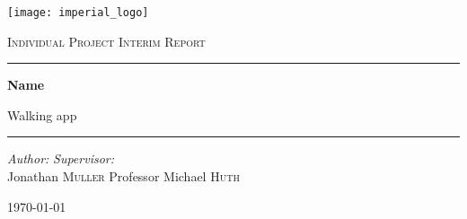 \begin{titlepage}
    \begin{center}
        \vspace*{2cm}
        \texttt{[image: imperial\_logo]}
        \vspace{2cm}
        
        \LARGE
        \textsc{Individual Project Interim Report}
        
        \vspace{2cm}
        \hrule
        \vspace{0.5cm}
        
        \huge
        \textbf{Name}
        
        \vspace{0.2cm}
        
        \LARGE
        Walking app
        
        \vspace{0.5cm}
        \hrule
        \vspace{1cm}
        
        \begin{flushleft}
            \Large
            \textit{Author:}
            \hfill
            \textit{Supervisor:}\\
            Jonathan \textsc{Muller}
            \hfill
            Professor Michael \textsc{Huth}\\
        \end{flushleft}
        
        \vfill
        \Large
        \today
    \end{center}
\end{titlepage}